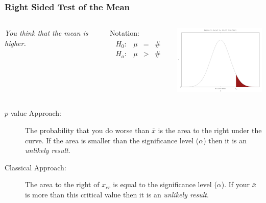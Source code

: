 \begin{frame}
  \frametitle{Right Sided Test of the Mean}

  \begin{columns}
    \textit{You think that the mean is higher.}

    Notation:
    \begin{eqnarray*}
      \begin{array}{lrcl}
        H_0: & \mu & = & \# \\
        H_a: & \mu & > & \#
      \end{array}
    \end{eqnarray*}


    \includegraphics[width=5cm]{img/rightSideHypothesisTest}

  \end{columns}

  \begin{description}
  \item[$p$-value Approach:] The probability that you do worse than
    $\bar{x}$ is the area to the right under the curve. If the area is
    smaller than the significance level ($\alpha$) then it is an
    \textit{unlikely result}.
  \item[Classical Approach:] The area to the right of $x_{cr}$ is
    equal to the significance level ($\alpha$). If your $\bar{x}$ is
    more than this critical value then it is an \textit{unlikely
      result}.
  \end{description}


\end{frame}


